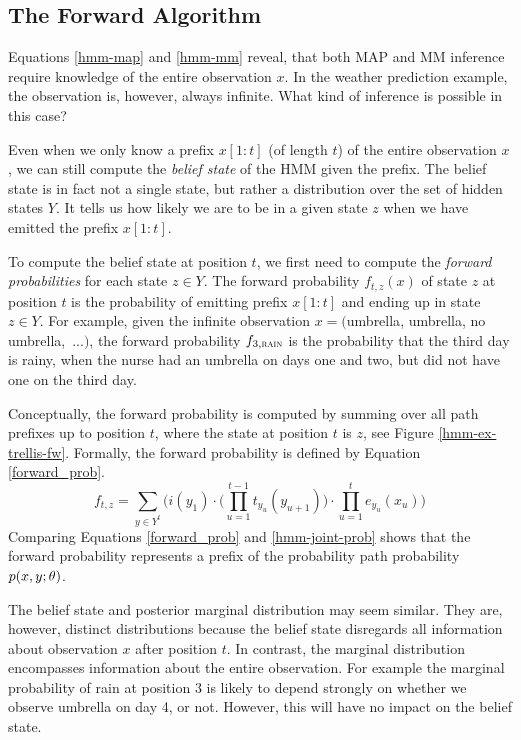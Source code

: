 \subsection{The Forward Algorithm}

Equations \eqref{hmm-map} and \eqref{hmm-mm} reveal, that both MAP
and MM inference require knowledge of the entire observation $x$. In
the weather prediction example, the observation is, however, always
infinite. What kind of inference is possible in this case?

Even when we only know a prefix $x[1:t]$ (of length $t$) of the entire
observation $x$, we can still compute the {\it belief state}
\citep{foo} of the HMM given the prefix. The belief state is in fact
not a single state, but rather a distribution over the set of hidden
states $Y$. It tells us how likely we are to be in a given state
$z$ when we have emitted the prefix $x[1:t]$.

To compute the belief state at position $t$, we first need to compute
the {\it forward probabilities} for each state $z \in Y$. The forward
probability $f_{t,z}(x)$ of state $z$ at position $t$ is the
probability of emitting prefix $x[1:t]$ and ending up in state $z \in
Y$. For example, given the infinite observation $x = (${\sc umbrella},
{\sc umbrella}, {\sc no umbrella},\ ...$)$, the forward probability
$f_{3,\textsc{rain}}$ is the probability that the third day is rainy,
when the nurse had an umbrella on days one and two, but did not have
one on the third day.

Conceptually, the forward probability is computed by summing over all
path prefixes up to position $t$, where the state at position $t$ is
$z$, see Figure \ref{hmm-ex-trellis-fw}. Formally, the forward
probability is defined by Equation \eqref{forward_prob}.
\begin{equation}
f_{t,z} = \sum_{y\in Y^t} \Bigg(i(y_1) \cdot \Bigg(\prod_{u = 1}^{t - 1} t_{y_u}(y_{u + 1}) \Bigg) \cdot \prod_{u = 1}^t e_{y_u}(x_u)\Bigg)\label{forward_prob}
\end{equation}
Comparing Equations \eqref{forward_prob} and \eqref{hmm-joint-prob}
shows that the forward probability represents a prefix of the
probability path probability $p(x, y \mbox{$ ; \, $} \theta)$.

The belief state and posterior marginal distribution may seem
similar. They are, however, distinct distributions because the belief
state disregards all information about observation $x$ after position
$t$. In contrast, the marginal distribution encompasses information about
the entire observation. For example the marginal probability of {\sc
  rain} at position 3 is likely to depend strongly on whether we
observe {\sc umbrella} on day 4, or not. However, this will have no
impact on the belief state.

